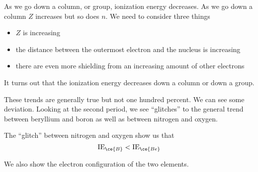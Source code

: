 \documentclass[../mit-general-chemistry.tex]{subfiles}
\begin{document}
As we go down a column, or group, ionization energy decreases. As we go down a
column $Z$ increases but so does $n$. We need to consider three things
\begin{itemize}
\item $Z$ is increasing
\item the distance between the outermost electron and the nucleus is
  increasing
\item there are even more shielding from an increasing amount of other
  electrons
\end{itemize}

It turns out that the ionization energy decreases down a column or
down a group.


These trends are generally true but not one hundred percent. We can
see some deviation. Looking at the second period, we see ``glitches''
to the general trend between beryllium and boron as well as between
nitrogen and oxygen.

\begin{center}
\end{center}

The ``glitch'' between nitrogen and oxygen show us that
\begin{equation*}
  \text{IE}_{\ce{B}} < \text{IE}_{\ce{Be}}
\end{equation*}

We also show the electron configuration of the two elements.

\begin{center}
  \begin{MOdiagram}[names,labels,labels-fs=\footnotesize]
    \EnergyAxis[title=$E$]
  \end{MOdiagram}
\end{center}
\end{document}
